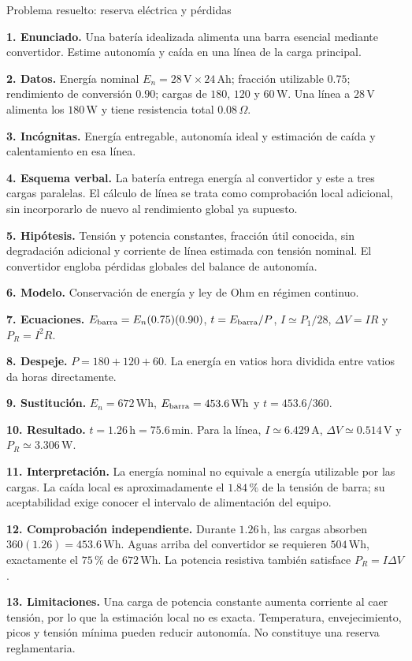 \begin{studiumworked}{Problema resuelto: reserva eléctrica y pérdidas}

\textbf{1. Enunciado.} Una batería idealizada alimenta una barra esencial mediante convertidor. Estime autonomía y caída en una línea de la carga principal.

\textbf{2. Datos.} Energía nominal $E_n=28\,\mathrm{V}\times24\,\mathrm{Ah}$; fracción utilizable $0.75$; rendimiento de conversión $0.90$; cargas de $180$, $120$ y $60\,\mathrm{W}$. Una línea a $28\,\mathrm{V}$ alimenta los $180\,\mathrm{W}$ y tiene resistencia total $0.08\,\Omega$.

\textbf{3. Incógnitas.} Energía entregable, autonomía ideal y estimación de caída y calentamiento en esa línea.

\textbf{4. Esquema verbal.} La batería entrega energía al convertidor y este a tres cargas paralelas. El cálculo de línea se trata como comprobación local adicional, sin incorporarlo de nuevo al rendimiento global ya supuesto.

\textbf{5. Hipótesis.} Tensión y potencia constantes, fracción útil conocida, sin degradación adicional y corriente de línea estimada con tensión nominal. El convertidor engloba pérdidas globales del balance de autonomía.

\textbf{6. Modelo.} Conservación de energía y ley de Ohm en régimen continuo.

\textbf{7. Ecuaciones.} $E_{\rm barra}=E_n(0.75)(0.90)$, $t=E_{\rm barra}/P$, $I\simeq P_1/28$, $\Delta V=IR$ y $P_R=I^2R$.

\textbf{8. Despeje.} $P=180+120+60$. La energía en vatios hora dividida entre vatios da horas directamente.

\textbf{9. Sustitución.} $E_n=672\,\mathrm{Wh}$, $E_{\rm barra}=453.6\,\mathrm{Wh}$ y $t=453.6/360$.

\textbf{10. Resultado.} $t=1.26\,\mathrm{h}=75.6\,\mathrm{min}$. Para la línea, $I\simeq6.429\,\mathrm{A}$, $\Delta V\simeq0.514\,\mathrm{V}$ y $P_R\simeq3.306\,\mathrm{W}$.

\textbf{11. Interpretación.} La energía nominal no equivale a energía utilizable por las cargas. La caída local es aproximadamente el $1.84\,\text{\%}$ de la tensión de barra; su aceptabilidad exige conocer el intervalo de alimentación del equipo.

\textbf{12. Comprobación independiente.} Durante $1.26\,\mathrm{h}$, las cargas absorben $360(1.26)=453.6\,\mathrm{Wh}$. Aguas arriba del convertidor se requieren $504\,\mathrm{Wh}$, exactamente el $75\,\text{\%}$ de $672\,\mathrm{Wh}$. La potencia resistiva también satisface $P_R=I\Delta V$.

\textbf{13. Limitaciones.} Una carga de potencia constante aumenta corriente al caer tensión, por lo que la estimación local no es exacta. Temperatura, envejecimiento, picos y tensión mínima pueden reducir autonomía. No constituye una reserva reglamentaria.


\end{studiumworked}

